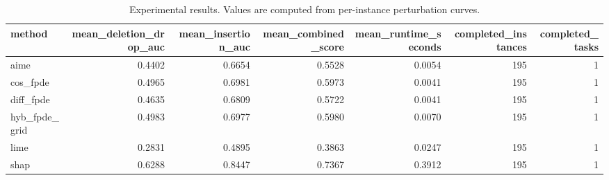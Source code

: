 \begin{table}[t]
\caption{Experimental results. Values are computed from per-instance perturbation curves.}
\label{tab:main_results_computed}
\centering
\begin{tabular}{lrrrrrr}
\toprule
method & mean\_deletion\_drop\_auc & mean\_insertion\_auc & mean\_combined\_score & mean\_runtime\_seconds & completed\_instances & completed\_tasks \\
\midrule
aime & 0.4402 & 0.6654 & 0.5528 & 0.0054 & 195 & 1 \\
cos\_fpde & 0.4965 & 0.6981 & 0.5973 & 0.0041 & 195 & 1 \\
diff\_fpde & 0.4635 & 0.6809 & 0.5722 & 0.0041 & 195 & 1 \\
hyb\_fpde\_grid & 0.4983 & 0.6977 & 0.5980 & 0.0070 & 195 & 1 \\
lime & 0.2831 & 0.4895 & 0.3863 & 0.0247 & 195 & 1 \\
shap & 0.6288 & 0.8447 & 0.7367 & 0.3912 & 195 & 1 \\
\bottomrule
\end{tabular}

\end{table}
